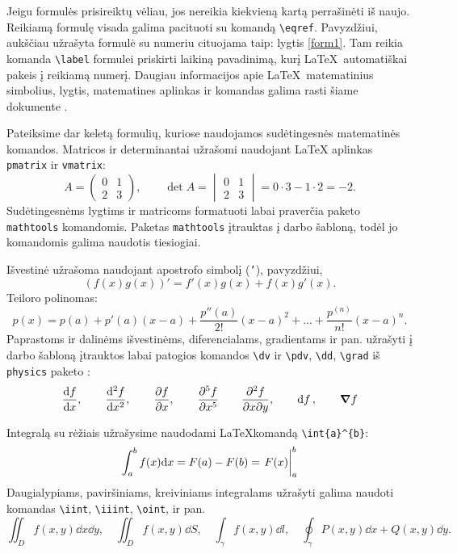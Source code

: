 \documentclass[]{VUMIFTemplateClass}
\begin{document}
\bigskip

Jeigu formulės prisireiktų vėliau, jos nereikia kiekvieną kartą perrašinėti iš naujo. Reikiamą formulę visada galima pacituoti su komandą \texttt{\textbackslash eqref}. Pavyzdžiui, aukščiau užrašyta formulė su numeriu cituojama taip: lygtis \eqref{form1}. Tam reikia komanda \texttt{\textbackslash  label} formulei priskirti laikiną pavadinimą, kurį \LaTeX~automatiškai pakeis į reikiamą numerį. Daugiau informacijos apie \LaTeX~matematinius simbolius, lygtis, matematines aplinkas ir komandas galima rasti šiame dokumente \cite{amsdoc}.

\bigskip

Pateiksime dar keletą formulių, kuriose naudojamos sudėtingesnės matematinės komandos. Matricos ir determinantai užrašomi naudojant LaTeX aplinkas \texttt{pmatrix} ir \texttt{vmatrix}:
\[
A= \begin{pmatrix}
    0 & 1\\
    2 & 3
\end{pmatrix}, \qquad
\det A =
\begin{vmatrix}
0 & 1\\
2 & 3    
\end{vmatrix} = 0 \cdot 3 - 1 \cdot 2 = -2.
\]
Sudėtingesnėms lygtims ir matricoms formatuoti labai praverčia paketo \texttt{mathtools} \cite{mtoolsdoc} komandomis. Paketas \texttt{mathtools} įtrauktas į darbo šabloną, todėl jo komandomis galima naudotis tiesiogiai.

Išvestinė užrašoma naudojant apostrofo simbolį (\texttt{'}), pavyzdžiui,
\[
(f(x)g(x))' = f'(x)g(x) + f(x)g'(x).
\]
Teiloro polinomas:
\[
p(x) = p(a) + p'(a)(x-a)+\frac{p''(a)}{2!}(x-a)^2 + ... + \frac{p^{(n)}}{n!}(x-a)^n.
\]
Paprastoms ir dalinėms išvestinėms, diferencialams, gradientams ir pan. užrašyti į darbo šabloną įtrauktos labai patogios komandos \texttt{\textbackslash dv} ir \texttt{\textbackslash pdv}, \texttt{\textbackslash dd}, \texttt{\textbackslash grad} iš \texttt{physics} paketo \cite{physdoc}:
\[
\dv{f}{x},  \qquad
\dv[2]{f}{x}, \qquad
\pdv{f}{x},  \qquad
\pdv[5]{f}{x} \qquad
\pdv{f}{x}{y}, \qquad
\dd{f}, \qquad
\grad{f}
\]

Integralą su rėžiais užrašysime naudodami \LaTeX komandą \texttt{\textbackslash int\textunderscore \{a\}\^{}\{b\}}:
\[
\int_{a}^{b}f(x) \dd x = F(a) - F(b) = \eval{F(x)}_{a}^{b}
\]
Daugialypiams, paviršiniams, kreiviniams integralams užrašyti galima naudoti komandas \texttt{\textbackslash iint}, \texttt{\textbackslash iiint}, \texttt{\textbackslash oint}, ir pan.
\[
\iint_{D}f(x, y)\dd{x}\dd{y},\quad
\iint_{D} f(x,y)\dd{S}, \quad
\int_{\gamma} f(x,y)\dd{l},\quad
\oint_{\gamma} P(x,y)\dd{x}+Q(x,y)\dd{y}.
\]
\end{document}
